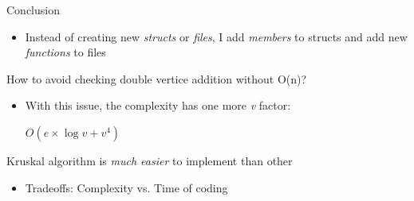 \documentclass[presentation]{beamer}
\begin{document}
\begin{frame}[label={sec:orgheadline15}]{Conclusion}
\begin{itemize}
\item Instead of creating new \emph{structs} or \emph{files}, I add \emph{members} to structs and add new \emph{functions} to files
\end{itemize}
\begin{block}{How to avoid checking \alert{double vertice addition} without \alert{O(n)}?}
\begin{itemize}
\item With this issue, the complexity has one more \emph{v} factor:
\begin{center}
\(O(e \times \log{v} + v^{4})\)
\end{center}
\end{itemize}
\end{block}

\begin{block}{Kruskal algorithm is \emph{much easier} to implement than other}
\begin{itemize}
\item Tradeoffs: Complexity vs. Time of coding
\end{itemize}
\end{block}
\end{frame}
\end{document}
